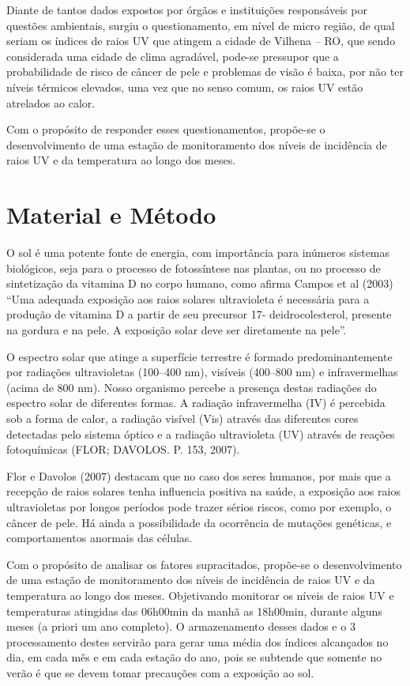 \documentclass[article,12pt,onesidea,4paper,english,brazil]{abntex2}
\begin{document}
	Diante de tantos dados expostos por órgãos e instituições responsáveis por questões ambientais, surgiu o questionamento, em nível de micro região, de qual seriam os índices de raios UV que atingem a cidade de Vilhena – RO, que sendo considerada uma cidade de clima agradável, pode-se pressupor que a probabilidade de risco de câncer de pele e problemas de visão é baixa, por não ter níveis térmicos elevados, uma vez que no senso comum, os raios UV estão atrelados ao calor.
	
	Com o propósito de responder esses questionamentos, propõe-se o desenvolvimento de uma estação de monitoramento dos níveis de incidência de raios UV e da temperatura ao longo dos meses.
	
	\section*{Material e Método}
	
O sol é uma potente fonte de energia, com importância para inúmeros sistemas biológicos, seja para o processo de fotossíntese nas plantas, ou no processo de sintetização da vitamina D no corpo humano, como afirma Campos et al (2003) “Uma adequada exposição aos raios solares ultravioleta é necessária para a produção de vitamina D a partir de seu precursor 17- deidrocolesterol, presente na gordura e na pele. A exposição solar deve ser diretamente na pele”. 

\begin{citacao}
	O espectro solar que atinge a superfície terrestre é formado predominantemente por radiações ultravioletas (100–400 nm), visíveis (400–800 nm) e infravermelhas (acima de 800 nm). Nosso organismo percebe a presença destas radiações do espectro solar de diferentes formas. A radiação infravermelha (IV) é percebida sob a forma de calor, a radiação visível (Vis) através das diferentes cores detectadas pelo sistema óptico e a radiação ultravioleta (UV) através de reações fotoquímicas (FLOR; DAVOLOS. P. 153, 2007).
\end{citacao}
	
	Flor e Davolos (2007) destacam que no caso dos seres humanos, por mais que a recepção de raios solares tenha influencia positiva na saúde, a exposição aos raios ultravioletas por longos períodos pode trazer sérios riscos, como por exemplo, o câncer de pele. Há ainda a possibilidade da ocorrência de mutações genéticas, e comportamentos anormais das células.
	
	Com o propósito de analisar os fatores supracitados, propõe-se o desenvolvimento de uma estação de monitoramento dos níveis de incidência de raios UV e da temperatura ao longo dos meses. Objetivando monitorar os níveis de raios UV e temperaturas atingidas das 06h00min da manhã as 18h00min, durante alguns meses (a priori um ano completo). O armazenamento desses dados e o
	3
	processamento destes servirão para gerar uma média dos índices alcançados no dia, em cada mês e em cada estação do ano, pois se subtende que somente no verão é que se devem tomar precauções com a exposição ao sol.
	
\end{document}
